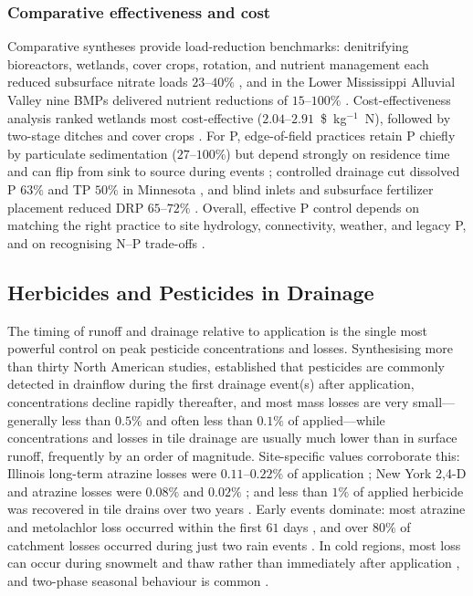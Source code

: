 \subsubsection{Comparative effectiveness and cost}

Comparative syntheses provide load-reduction benchmarks: denitrifying
bioreactors, wetlands, cover crops, rotation, and nutrient management each
reduced subsurface nitrate loads $23$--$40\%$ \parencite{Yuan2022}, and in the
Lower Mississippi Alluvial Valley nine BMPs delivered nutrient reductions of
$15$--$100\%$ \parencite{Kröger2012}. Cost-effectiveness analysis ranked
wetlands most cost-effective ($2.04$--$2.91$~\$~kg$^{-1}$~N), followed by
two-stage ditches and cover crops \parencite{Roley2016,Messer2021}. For P,
edge-of-field practices retain P chiefly by particulate sedimentation
($27$--$100\%$) but depend strongly on residence time and can flip from sink
to source during events \parencite{Mendes2020,Kröger2013,Singh2020c};
controlled drainage cut dissolved P $63\%$ and TP $50\%$ in Minnesota
\parencite{Kröger2013,Nash2015c}, and blind inlets and subsurface fertilizer
placement reduced DRP $65$--$72\%$ \parencite{Kröger2013,Wilson2019,Sharpley2019}.
Overall, effective P control depends on matching the right practice to site
hydrology, connectivity, weather, and legacy P, and on recognising N--P
trade-offs \parencite{King2015,Ni2020,Baulch2019}.

\subsection{Herbicides and Pesticides in Drainage}

The timing of runoff and drainage relative to application is the single most
powerful control on peak pesticide concentrations and losses. Synthesising
more than thirty North American studies, \textcite{Kladivko2001} established
that pesticides are commonly detected in drainflow during the first drainage
event(s) after application, concentrations decline rapidly thereafter, and
most mass losses are very small---generally less than $0.5\%$ and often less
than $0.1\%$ of applied---while concentrations and losses in tile drainage are
usually much lower than in surface runoff, frequently by an order of
magnitude. Site-specific values corroborate this: Illinois long-term atrazine
losses were $0.11$--$0.22\%$ of application \parencite{Kalita2006}; New York
2,4-D and atrazine losses were $0.08\%$ and $0.02\%$ \parencite{Shalit1996};
and less than $1\%$ of applied herbicide was recovered in tile drains over two
years \parencite{Fortin2002,Siimes2006}. Early events dominate: most atrazine
and metolachlor loss occurred within the first $61$ days
\parencite{SOUTHWICK1990}, and over $80\%$ of catchment losses occurred during
just two rain events \parencite{Leu2004}. In cold regions, most loss can occur
during snowmelt and thaw rather than immediately after application
\parencite{Siimes2006}, and two-phase seasonal behaviour is common
\parencite{Novak2001,Dousset2004}.

